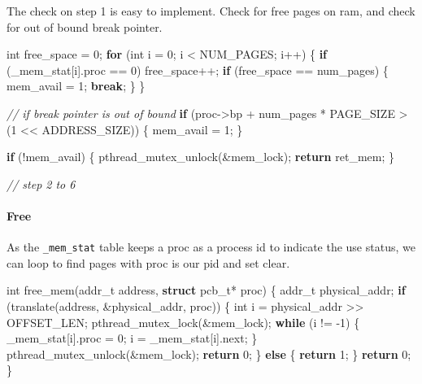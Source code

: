 \documentclass[]{article}
\newenvironment{Shaded}{}{}
\newcommand{\KeywordTok}[1]{\textcolor[rgb]{0.00,0.44,0.13}{\textbf{#1}}}
\newcommand{\DataTypeTok}[1]{\textcolor[rgb]{0.56,0.13,0.00}{#1}}
\newcommand{\DecValTok}[1]{\textcolor[rgb]{0.25,0.63,0.44}{#1}}
\newcommand{\CommentTok}[1]{\textcolor[rgb]{0.38,0.63,0.69}{\textit{#1}}}
\newcommand{\ControlFlowTok}[1]{\textcolor[rgb]{0.00,0.44,0.13}{\textbf{#1}}}
\newcommand{\NormalTok}[1]{#1}
\let\oldparagraph\paragraph
\renewcommand{\paragraph}[1]{\oldparagraph{#1}\mbox{}}
\begin{document}
The check on step 1 is easy to implement. Check for free pages on ram,
and check for out of bound break pointer.

\begin{Shaded}
\begin{Highlighting}[]
\DataTypeTok{int}\NormalTok{ free_space = }\DecValTok{0}\NormalTok{;}
\ControlFlowTok{for}\NormalTok{ (}\DataTypeTok{int}\NormalTok{ i = }\DecValTok{0}\NormalTok{; i < NUM_PAGES; i++) \{}
      \ControlFlowTok{if}\NormalTok{ (_mem_stat[i].proc == }\DecValTok{0}\NormalTok{)}
\NormalTok{            free_space++;}
      \ControlFlowTok{if}\NormalTok{ (free_space == num_pages) \{}
\NormalTok{            mem_avail = }\DecValTok{1}\NormalTok{;}
            \ControlFlowTok{break}\NormalTok{;}
\NormalTok{      \}}
\NormalTok{\}}

\CommentTok{// if break pointer is out of bound}
\ControlFlowTok{if}\NormalTok{ (proc->bp + num_pages * PAGE_SIZE > (}\DecValTok{1}\NormalTok{ << ADDRESS_SIZE)) \{}
\NormalTok{      mem_avail = }\DecValTok{1}\NormalTok{;}
\NormalTok{\}}

\ControlFlowTok{if}\NormalTok{ (!mem_avail) \{}
\NormalTok{      pthread_mutex_unlock(&mem_lock);}
      \ControlFlowTok{return}\NormalTok{ ret_mem;}
\NormalTok{\}}

\CommentTok{// step 2 to 6}
\end{Highlighting}
\end{Shaded}

\paragraph{Free}\label{free}

As the \texttt{\_mem\_stat} table keeps a proc as a process id to
indicate the use status, we can loop to find pages with proc is our pid
and set clear.

\begin{Shaded}
\begin{Highlighting}[]
\DataTypeTok{int}\NormalTok{ free_mem(addr_t address, }\KeywordTok{struct}\NormalTok{ pcb_t* proc) \{}
\NormalTok{        addr_t physical_addr;}
        \ControlFlowTok{if}\NormalTok{ (translate(address, &physical_addr, proc)) \{}
                \DataTypeTok{int}\NormalTok{ i = physical_addr >> OFFSET_LEN;}
\NormalTok{                pthread_mutex_lock(&mem_lock);}
                \ControlFlowTok{while}\NormalTok{ (i != }\DecValTok{-1}\NormalTok{) \{}
\NormalTok{                        _mem_stat[i].proc = }\DecValTok{0}\NormalTok{;}
\NormalTok{                        i = _mem_stat[i].next;}
\NormalTok{                \}}
\NormalTok{                pthread_mutex_unlock(&mem_lock);}
                \ControlFlowTok{return} \DecValTok{0}\NormalTok{;}
\NormalTok{        \} }\ControlFlowTok{else}\NormalTok{ \{}
                \ControlFlowTok{return} \DecValTok{1}\NormalTok{;}
\NormalTok{        \}}
        \ControlFlowTok{return} \DecValTok{0}\NormalTok{;}
\NormalTok{\}}
\end{Highlighting}
\end{Shaded}
\end{document}
